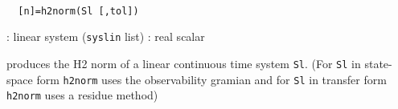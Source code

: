 \begin{mandesc}
   \\ %
\end{mandesc}
\begin{calling_sequence}
\begin{verbatim}
  [n]=h2norm(Sl [,tol])  
\end{verbatim}
\end{calling_sequence}
\begin{parameters}
  \begin{varlist}
    : linear system (\verb!syslin! list)
    : real scalar
  \end{varlist}
\end{parameters}
\begin{mandescription}
  produces the H2 norm  of a linear continuous time system \verb!Sl!.
  (For \verb!Sl! in state-space form \verb!h2norm! uses the observability
  gramian and for \verb!Sl! in transfer form \verb!h2norm! uses a residue method)
\end{mandescription}
